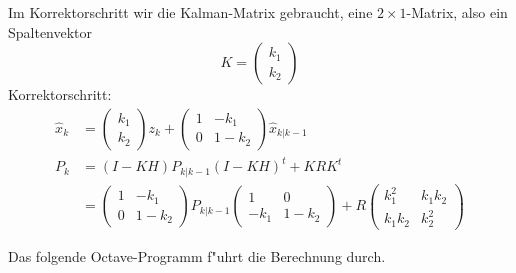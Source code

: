 \begin{loesung}
\begin{teilaufgaben}
Im Korrektorschritt wir die Kalman-Matrix gebraucht, eine
$2\times 1$-Matrix, also ein Spaltenvektor
\[
K=
\begin{pmatrix}k_1\\k_2\end{pmatrix}
\]
Korrektorschritt:
\begin{align*}
\hat x_k
&=
\begin{pmatrix}k_1\\k_2\end{pmatrix}z_k
+
\begin{pmatrix}
1&-k_1\\
0&1-k_2
\end{pmatrix}
\hat x_{k|k-1}
\\
P_k
&=
(I-KH)P_{k|k-1}(I-KH)^t+KRK^t
\\
&=
\begin{pmatrix}
1&-k_1\\
0&1-k_2
\end{pmatrix}
P_{k|k-1}
\begin{pmatrix}
1&0\\
-k_1&1-k_2
\end{pmatrix}
+
R
\begin{pmatrix}
k_1^2&k_1k_2\\
k_1k_2&k_2^2
\end{pmatrix}
\end{align*}
\item
Das folgende Octave-Programm f"uhrt die Berechnung durch.
\end{teilaufgaben}
\end{loesung}

